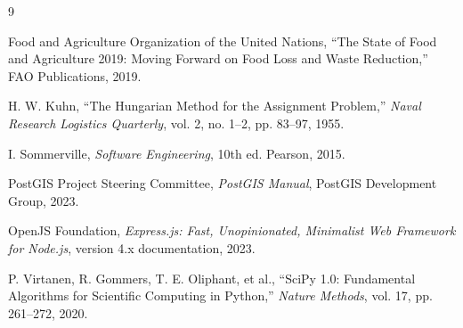 \documentclass[12pt,a4paper]{report}
\begin{document}
\begin{thebibliography}{9}

 Food and Agriculture Organization of the United Nations, ``The State of Food and Agriculture 2019: Moving Forward on Food Loss and Waste Reduction,'' FAO Publications, 2019.

 H. W. Kuhn, ``The Hungarian Method for the Assignment Problem,'' \textit{Naval Research Logistics Quarterly}, vol. 2, no. 1--2, pp. 83--97, 1955.

 I. Sommerville, \textit{Software Engineering}, 10th ed. Pearson, 2015.

 PostGIS Project Steering Committee, \textit{PostGIS Manual}, PostGIS Development Group, 2023.

 OpenJS Foundation, \textit{Express.js: Fast, Unopinionated, Minimalist Web Framework for Node.js}, version 4.x documentation, 2023.

 P. Virtanen, R. Gommers, T. E. Oliphant, et al., ``SciPy 1.0: Fundamental Algorithms for Scientific Computing in Python,'' \textit{Nature Methods}, vol. 17, pp. 261--272, 2020.

\end{thebibliography}
\end{document}

